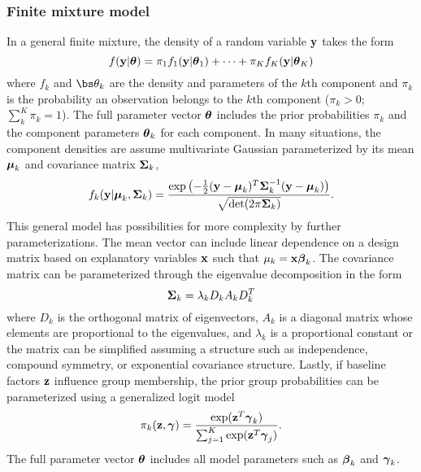 \subsubsection{Finite mixture model}
In a general finite mixture, the density of a random variable $\mathbf y$ takes the form
$$f(\mathbf y|\boldsymbol\theta)=\pi_{1}f_{1}(\mathbf y|\boldsymbol\theta_1)+\cdots+\pi_{K}f_{K}(\mathbf y|\boldsymbol\theta_K)$$
where $f_k$ and $\bs\theta_k$ are the density and parameters of the $k$th component and $\pi_{k}$ is the probability an observation belongs to the $k$th component ($\pi_{k}>0$; $\sum^{K}_{k}\pi_{k}=1$). The full parameter vector $\boldsymbol\theta$ includes the prior probabilities $\pi_k$ and the component parameters $\boldsymbol\theta_k$ for each component. In many situations, the component densities are assume multivariate Gaussian parameterized by its mean $\boldsymbol\mu_{k}$ and covariance matrix $\boldsymbol\Sigma_{k}$,
$$f_k(\mathbf y| \boldsymbol\mu_k,\boldsymbol\Sigma_k) = \frac{\exp\left(-\frac{1}{2}(\mathbf y - \boldsymbol\mu_k)^T\boldsymbol\Sigma_k^{-1}(\mathbf y-\boldsymbol\mu_k)\right)}{\sqrt{\det(2\pi \boldsymbol\Sigma_k)}}.$$
This general model has possibilities for more complexity by further parameterizations. The mean vector can include linear dependence on a design matrix based on explanatory variables $\mathbf x$ such that $\mu_k = \mathbf x \boldsymbol \beta_k$. The covariance matrix can be parameterized through the eigenvalue decomposition in the form
$$\boldsymbol\Sigma_k=\lambda_k D_kA_kD_k^T$$
where $D_k$ is the orthogonal matrix of eigenvectors, $A_k$ is a diagonal matrix whose elements are proportional to the eigenvalues, and $\lambda_k$ is a proportional constant \cite{banfield1993} or the matrix can be simplified assuming a structure such as independence, compound symmetry, or exponential covariance structure. Lastly, if baseline factors $\mathbf z$ influence group membership, the prior group probabilities can be parameterized using a generalized logit model
$$\pi_k(\mathbf z, \boldsymbol\gamma) = \frac{\exp(\mathbf z^T \boldsymbol \gamma_k) }{\sum_{j=1}^K \exp(\mathbf z^T \boldsymbol \gamma_j)}.$$
The full parameter vector $\boldsymbol\theta$ includes all model parameters such as $\boldsymbol\beta_k$ and $\boldsymbol\gamma_k$.


